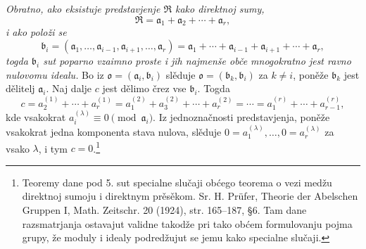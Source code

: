 \documentclass[11pt]{article}
\providecommand{\mR}{\mathfrak{R}}
\providecommand{\ma}{\mathfrak{a}}
\providecommand{\mb}{\mathfrak{b}}
\providecommand{\mo}{\mathfrak{o}}
\begin{document}
\emph{Obratno, ako eksistuje predstavjenje $\mR$ kako direktnoj sumy,
\[
\mR=\ma_1+\ma_2+\cdots+\ma_r,
\]
i ako položi se
\[
\mb_i=(\ma_1,\ldots,\ma_{i-1},\ma_{i+1},\ldots,\ma_r)
=\ma_1+\cdots+\ma_{i-1}+\ma_{i+1}+\cdots+\ma_r,
\]
togda $\mb_i$ sut poparno vzaimno proste i jih najmenše obče mnogokratno jest ravno nulovomu idealu.} Bo iz $\mo=(\ma_i,\mb_i)$ slěduje $\mo=(\mb_k,\mb_i)$ za $k\ne i$, poněže $\mb_k$ jest dělitelj $\ma_i$. Naj dalje $c$ jest dělimo črez vse $\mb_i$. Togda
\[
 c=a_2^{(1)}+\cdots+a_r^{(1)}
 =a_1^{(2)}+a_3^{(2)}+\cdots+a_r^{(2)}
 =\cdots=a_1^{(r)}+\cdots+a_{r-1}^{(r)},
\]
kde vsakokrat $a_i^{(\lambda)}\equiv0\pmod{\ma_i}$. Iz jednoznačnosti predstavjenja, poněže vsakokrat jedna komponenta stava nulova, slěduje $0=a_1^{(\lambda)},\ldots,0=a_r^{(\lambda)}$ za vsako $\lambda$, i tym $c=0$.\footnote{Teoremy dane pod 5. sut specialne slučaji obćego teorema o vezi medžu direktnoj sumoju i direktnym prěsěkom. Sr. H. Prüfer, Theorie der Abelschen Gruppen I, Math. Zeitschr. 20 (1924), str. 165--187, §6. Tam dane razsmatrjanja ostavajut validne takodže pri tako obćem formulovanju pojma grupy, že moduly i idealy podredžujut se jemu kako specialne slučaji.}
\end{document}
